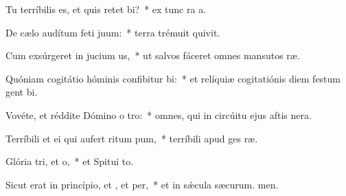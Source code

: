 \item Tu terríbilis es, et quis retet bi?~* ex tunc ra a.
\item De cælo audítum feti juum:~* terra trémuit  quivit.
\item Cum exsúrgeret in jucium us,~* ut salvos fáceret omnes mansutos ræ.
\item Quóniam cogitátio hóminis confibitur bi:~* et relíquiæ cogitatiónis diem festum gent bi.
\item Vovéte, et réddite Dómino o tro:~* omnes, qui in circúitu ejus aftis nera.
\item Terríbili et ei qui aufert ritum pum,~* terríbili apud ges ræ.
\item Glória tri, et o,~* et Spitui to.
\item Sicut erat in princípio, et , et per,~* et in sǽcula sæcurum. men.
